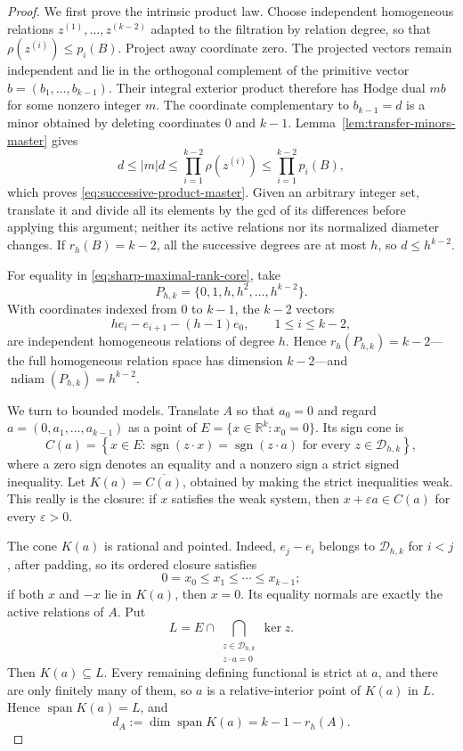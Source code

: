 \documentclass[11pt,reqno]{amsart}
\theoremstyle{definition}
\theoremstyle{remark}
\newcommand{\ndiam}{\operatorname{ndiam}}
\begin{document}
\begin{proof}
We first prove the intrinsic product law.  Choose independent homogeneous
relations $z^{(1)},\ldots,z^{(k-2)}$ adapted to the filtration by relation
degree, so that $\rho(z^{(i)})\leq p_i(B)$.  Project away coordinate zero.
The projected vectors remain independent and lie in the orthogonal complement
of the primitive vector $b=(b_1,\ldots,b_{k-1})$.  Their integral exterior
product therefore has Hodge dual $mb$ for some nonzero integer $m$.  The
coordinate complementary to $b_{k-1}=d$ is a minor obtained by deleting
coordinates $0$ and $k-1$.  Lemma~\ref{lem:transfer-minors-master} gives
\[
 d\leq |m|d
 \leq\prod_{i=1}^{k-2}\rho(z^{(i)})
 \leq\prod_{i=1}^{k-2}p_i(B),
\]
 which proves \eqref{eq:successive-product-master}.  Given an arbitrary
 integer set, translate it and divide all its elements by the gcd of its
 differences before applying this argument; neither its active relations nor
 its normalized diameter changes.  If $r_h(B)=k-2$, all the successive
 degrees are at most $h$, so $d\leq h^{k-2}$.

For equality in \eqref{eq:sharp-maximal-rank-core}, take
\[
 P_{h,k}=\{0,1,h,h^2,\ldots,h^{k-2}\}.
\]
With coordinates indexed from $0$ to $k-1$, the $k-2$ vectors
\[
 h e_i-e_{i+1}-(h-1)e_0,
 \qquad 1\leq i\leq k-2,
\]
are independent homogeneous relations of degree $h$.  Hence
$r_h(P_{h,k})=k-2$---the full homogeneous relation space has dimension
$k-2$---and $\ndiam(P_{h,k})=h^{k-2}$.

We turn to bounded models.  Translate $A$ so that $a_0=0$ and regard
$a=(0,a_1,\ldots,a_{k-1})$ as a point of
$E=\{x\in\mathbb R^k:x_0=0\}$.  Its sign cone is
\[
 C(a)=\left\{x\in E:
 \operatorname{sgn}(z\cdot x)=\operatorname{sgn}(z\cdot a)
 \text{ for every }z\in\mathcal D_{h,k}\right\},
\]
where a zero sign denotes an equality and a nonzero sign a strict signed
inequality.  Let $K(a)=\overline{C(a)}$, obtained by making the strict
inequalities weak.  This really is the closure: if $x$ satisfies the weak
system, then $x+\varepsilon a\in C(a)$ for every $\varepsilon>0$.

The cone $K(a)$ is rational and pointed.  Indeed, $e_j-e_i$ belongs to
$\mathcal D_{h,k}$ for $i<j$, after padding, so its ordered closure satisfies
\[
 0=x_0\leq x_1\leq\cdots\leq x_{k-1};
\]
if both $x$ and $-x$ lie in $K(a)$, then $x=0$.  Its equality normals are
exactly the active relations of $A$.  Put
\[
 L=E\cap\bigcap_{\substack{z\in\mathcal D_{h,k}\\z\cdot a=0}}\ker z.
\]
Then $K(a)\subseteq L$.  Every remaining defining functional is strict at
$a$, and there are only finitely many of them, so $a$ is a relative-interior
point of $K(a)$ in $L$.  Hence $\operatorname{span}K(a)=L$, and
\begin{equation}\label{eq:sign-cone-dimension}
 d_A:=\dim\operatorname{span}K(a)=k-1-r_h(A).
\end{equation}


\end{proof}
\end{document}
